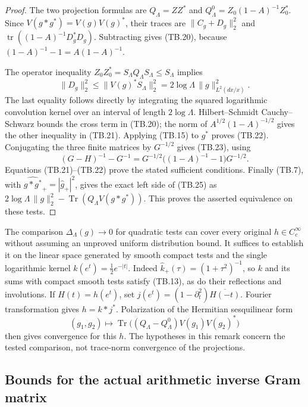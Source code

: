 \begin{proof}
The two projection formulas are
\(Q_\Lambda=ZZ^*\) and
\(Q_\Lambda^0=Z_0(1-A)^{-1}Z_0^*\).
Since \(V(g*g^*)=V(g)V(g)^*\), their traces are
\(\|C_g+D_g\|_2^2\) and
\(\operatorname{tr}((1-A)^{-1}D_g^*D_g)\).
Subtracting gives (TB.20), because
\((1-A)^{-1}-1=A(1-A)^{-1}\).

The operator inequality \(Z_0Z_0^*=S_\Lambda Q_\Lambda
S_\Lambda\leq S_\Lambda\) implies
\[
 \|D_g\|_2^2
 \leq\|V(g)^*S_\Lambda\|_2^2
              =2\log\Lambda\,\|g\|_{L^2(dx/x)}^2.
\]
The last equality follows directly by integrating the squared
logarithmic convolution kernel over an interval of length
\(2\log\Lambda\).  Hilbert--Schmidt Cauchy--Schwarz bounds
the cross term in (TB.20); the norm of
\(A^{1/2}(1-A)^{-1/2}\) gives the other inequality in
(TB.21).  Applying (TB.15) to \(g^*\) proves (TB.22).
Conjugating the three finite matrices by \(G^{-1/2}\)
gives (TB.23), using
\[
 (G-H)^{-1}-G^{-1}
 =G^{-1/2}\bigl((1-A)^{-1}-1\bigr)G^{-1/2}.
\]
Equations (TB.21)--(TB.22) prove the stated sufficient
conditions.  Finally (TB.7), with
\(\widehat{g*g^*}_+=|\widehat g_+|^2\), gives the exact
left side of (TB.25) as
\(2\log\Lambda\,\|g\|_2^2-
\operatorname{Tr}(Q_\Lambda V(g*g^*))\).
This proves the asserted equivalence on these tests.
\end{proof}

\begin{remark}
\label{rem:AC-T26alltests}
The comparison \(\Delta_\Lambda(g)\to0\) for quadratic
tests can cover every original \(h\in C_c^\infty\) without
assuming an unproved uniform distribution bound.  It suffices
to establish it on the linear space generated by smooth
compact tests and the single logarithmic kernel
\(k(e^t)=\tfrac12e^{-|t|}\).
Indeed \(\widehat k_+(\tau)=(1+\tau^2)^{-1}\), so \(k\)
and its sums with compact smooth tests satisfy (TB.13), as
do their reflections and involutions.  If
\(H(t)=h(e^t)\), set
\(j(e^t)=(1-\partial_t^2)\overline{H(-t)}\).
Fourier transformation gives \(h=k*j^*\).
Polarization of the Hermitian sesquilinear form
\[
 (g_1,g_2)\longmapsto
 \operatorname{Tr}\bigl((Q_\Lambda-Q_\Lambda^0)
                            V(g_1)V(g_2)^*\bigr)
\]
then gives convergence for this \(h\).
The hypotheses in this remark concern the tested comparison,
not trace-norm convergence of the projections.
\end{remark}

\subsection{Bounds for the actual arithmetic inverse Gram matrix}


